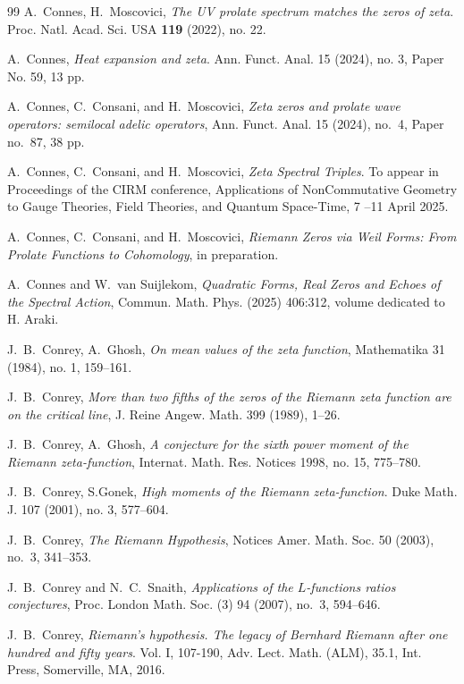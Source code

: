 \documentclass{article}
\begin{document}
\begin{thebibliography}{99}
 A.~Connes, H.~Moscovici, {\em The UV prolate spectrum matches the zeros of zeta}. Proc. Natl. Acad. Sci. USA \textbf{119} (2022), no. 22.

 A.~Connes, {\em Heat expansion and zeta}.
Ann. Funct. Anal. 15 (2024), no. 3, Paper No. 59, 13 pp.

A.~Connes, C.~Consani, and H.~Moscovici, 
\emph{Zeta zeros and prolate wave operators: semilocal adelic operators}, 
Ann. Funct. Anal. 15 (2024), no.~4, Paper no.~87, 38 pp.

A.~Connes, C.~Consani, and H.~Moscovici, 
\emph{Zeta Spectral Triples}. To appear in Proceedings of the CIRM conference, Applications of NonCommutative Geometry to Gauge Theories, Field Theories, and Quantum Space-Time, 7 --11 April 2025.

A.~Connes, C.~Consani, and H.~Moscovici, 
\emph{Riemann Zeros via Weil Forms: From Prolate Functions to Cohomology}, in preparation.

A.~Connes and W.~van Suijlekom, 
\emph{Quadratic Forms, Real Zeros and Echoes of the Spectral Action}, Commun. Math. Phys. (2025) 406:312, volume dedicated to H. Araki.

 J.~B.~Conrey, A.~Ghosh, \emph{ On mean values of the zeta function}, Mathematika 31 (1984), no. 1, 159--161.

J.~B.~Conrey, 
\emph{More than two fifths of the zeros of the Riemann zeta function are on the critical line}, 
J. Reine Angew. Math. 399 (1989), 1--26.

 J.~B.~Conrey, A.~Ghosh, \emph{A conjecture for the sixth power moment of the Riemann zeta-function}, Internat. Math. Res. Notices 1998, no. 15, 775--780.

 J.~B.~Conrey, S.Gonek, \emph{ High moments of the Riemann zeta-function}. Duke Math. J. 107 (2001), no. 3, 577--604.

J.~B.~Conrey, 
\emph{The Riemann Hypothesis}, 
Notices Amer. Math. Soc. 50 (2003), no.~3, 341--353.

J.~B.~Conrey and N.~C.~Snaith, 
\emph{Applications of the $L$-functions ratios conjectures}, 
Proc. London Math. Soc. (3) 94 (2007), no.~3, 594--646.

 J.~B.~Conrey,  \emph{Riemann's hypothesis. The legacy of Bernhard Riemann after one hundred and fifty years}. Vol. I, 107-190, Adv. Lect. Math. (ALM), 35.1, Int. Press, Somerville, MA, 2016.


\end{thebibliography}
\end{document}

